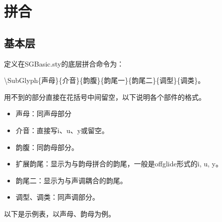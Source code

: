 \section{拼合}
\subsection{基本层}
定义在SGBasic.sty的底层拼合命令为：\par
{\textbackslash}SubGlyph\{声母\}\{介音\}{\{}韵腹{\}}\{韵尾一\}\{韵尾二\}{\{}调型{\}}{\{}调类{\}}。\par
用不到的部分直接在花括号中间留空，以下说明各个部件的格式。\par
\begin{itemize}
	\item 声母：同声母部分
	\item 介音：直接写i、u、y或留空。
	\item 韵腹：同韵母部分。
	\item 扩展韵尾：显示为与韵母拼合的韵尾，一般是offglide形式的i, u, y。
	\item 韵尾二：显示为与声调耦合的韵尾。
	\item 调型、调类：同声调部分。
\end{itemize}
以下是示例表，以声母、韵母为例。\par
%

